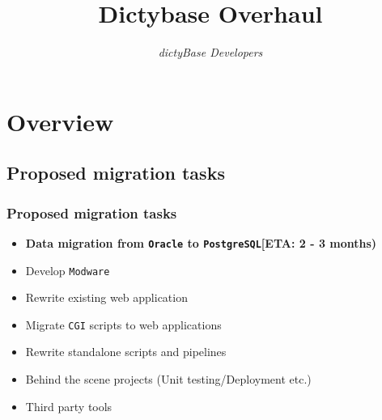 \documentclass[hyperref={pdfpagelabels=false}, compress]{beamer}
\title{Dictybase Overhaul}
\author{\textit{dictyBase Developers}}
\date
\begin{document}
\frame{\titlepage}



\section{Overview}

\subsection{Proposed migration tasks}
\begin{frame}
	\frametitle{Proposed migration tasks}
	
    	\begin{itemize}
		\item \textbf{Data migration from \texttt{Oracle} to \texttt{PostgreSQL}\newline [ETA: 2 - 3 months)}
    		\item Develop \texttt{Modware}
    		\item Rewrite existing web application
    		\item Migrate \texttt{CGI} scripts to web applications 
    		\item Rewrite standalone scripts and pipelines
    		\item Behind the scene projects (Unit testing/Deployment etc.)
    		\item Third party tools
	\end{itemize}
\end{frame}
\end{document}
